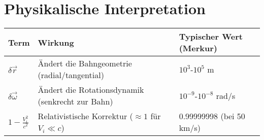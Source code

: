\section{Physikalische Interpretation}
\begin{tabular}{|l|l|l|}
\hline
\textbf{Term} & \textbf{Wirkung} & \textbf{Typischer Wert (Merkur)} \\ \hline
$\delta \vec{r}$ & Ändert die Bahngeometrie (radial/tangential) & $10^3$-$10^5$ m \\ \hline
$\delta \vec{\omega}$ & Ändert die Rotationsdynamik (senkrecht zur Bahn) & $10^{-9}$-$10^{-8}$ rad/s \\ \hline
$1-\frac{V_i^2}{c^2}$ & Relativistische Korrektur ($\approx1$ für $V_i \ll c$) & 0.99999998 (bei 50 km/s) \\ \hline
\end{tabular}